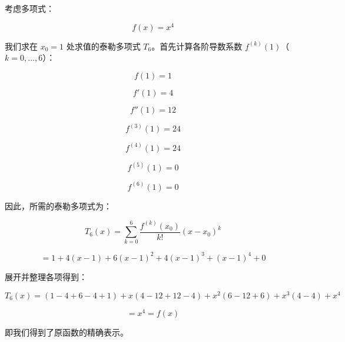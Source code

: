 \begin{notebox}
考虑多项式：

\begin{equation}
f(x) = x^4
\tag{5.9}\label{eq:5-9}
\end{equation}

我们求在 $ x_0 = 1 $ 处求值的泰勒多项式 $ T_6 $。首先计算各阶导数系数 $ f^{(k)}(1) $（$ k = 0, \ldots, 6 $）：

\begin{equation}
f(1) = 1
\tag{5.10}\label{eq:5-10}
\end{equation}

\begin{equation}
f'(1) = 4
\tag{5.11}\label{eq:5-11}
\end{equation}

\begin{equation}
f''(1) = 12
\tag{5.12}\label{eq:5-12}
\end{equation}

\begin{equation}
f^{(3)}(1) = 24
\tag{5.13}\label{eq:5-13}
\end{equation}

\begin{equation}
f^{(4)}(1) = 24
\tag{5.14}\label{eq:5-14}
\end{equation}

\begin{equation}
f^{(5)}(1) = 0
\tag{5.15}\label{eq:5-15}
\end{equation}

\begin{equation}
f^{(6)}(1) = 0
\tag{5.16}\label{eq:5-16}
\end{equation}

因此，所需的泰勒多项式为：

\begin{equation}
T_6(x) = \sum_{k=0}^6 \frac{f^{(k)}(x_0)}{k!} (x - x_0)^k
\tag{5.17a}\label{eq:5-17a}
\end{equation}

\begin{equation}
= 1 + 4(x - 1) + 6(x - 1)^2 + 4(x - 1)^3 + (x - 1)^4 + 0
\tag{5.17b}\label{eq:5-17b}
\end{equation}

展开并整理各项得到：

\begin{equation}
T_6(x) = (1 - 4 + 6 - 4 + 1) + x(4 - 12 + 12 - 4) + x^2(6 - 12 + 6) + x^3(4 - 4) + x^4
\tag{5.18a}\label{eq:5-18a}
\end{equation}

\begin{equation}
= x^4 = f(x)
\tag{5.18b}\label{eq:5-18b}
\end{equation}

即我们得到了原函数的精确表示。
\end{notebox}


